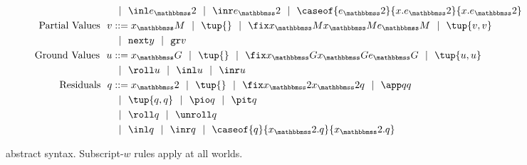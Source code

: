 \begin{figure}[t]
\begin{abstrsyn}
\[\begin{aligned}
&\gbar \inl \exprT \gbar \inr \exprT
 \gbar \caseof {\exprT}{\var.\exprT}{\var.\exprT} \\ 
\text{Partial Values}\ \ 
v &::= \varM
 \gbar\tup{}
 \gbar \fix \varM \varM \exprM
 \gbar \tup{v, v} \\
&\gbar \next y
 \gbar \pure v \\
\text{Ground Values}\ \ 
u &::= \varG
 \gbar\tup{}
 \gbar \fix \varG \varG \exprG
 \gbar \tup{u, u} \\
&\gbar \roll u
 \gbar \inl u 
 \gbar \inr u \\
\text{Residuals}\ \ 
q &::= \varT
 \gbar \tup{}
 \gbar \fix \varT \varT q
 \gbar \app q q \\
&\gbar \tup{q, q} 
 \gbar \pio q 
 \gbar \pit q \\
&\gbar \roll q
 \gbar \unroll q\\
&\gbar \inl q 
 \gbar \inr q
 \gbar \caseof {q}{\varT.q}{\varT.q} \\
\end{aligned}\]
\end{abstrsyn}
\caption{\lang\ abstract syntax. Subscript-$w$ rules apply at all worlds.}
\label{fig:grammar}
\end{figure}
